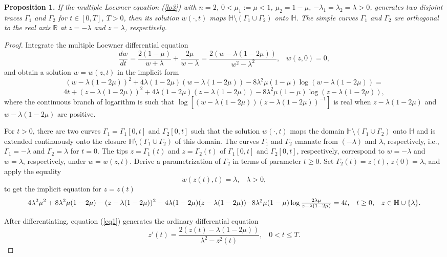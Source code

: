 \documentclass[
11pt,%
tightenlines,%
twoside,%
onecolumn,%
nofloats,%
nobibnotes,%
nofootinbib,%
superscriptaddress,%
noshowpacs,%
centertags]%
{revtex4}
\begin{document}
{\bf Proposition 1.}
{\it If the multiple Loewner equation (\ref{lo3}) with $n=2$, $0<\mu_1:=\mu<1$, $\mu_2=1-\mu$, $-\lambda_1=\lambda_2=\lambda>0$, generates two disjoint traces $\Gamma_1$ and $\Gamma_2$ for $t\in[0,T]$, $T>0$, then its solution $w(\cdot,t)$ maps $\mathbb H\setminus(\Gamma_1\cup\Gamma_2)$ onto $\mathbb H$. The simple curves $\Gamma_1$ and $\Gamma_2$ are orthogonal to the real axis $\mathbb R$ at $z=-\lambda$ and $z=\lambda$, respectively.}
\begin{proof}

Integrate the multiple Loewner differential equation $$\frac{dw}{dt}=\frac{2(1-\mu)}{w+\lambda}+\frac{2\mu}{w-\lambda}=\frac{2(w-\lambda(1-2\mu))}{w^2-\lambda^2},\;\;\;w(z,0)=0,$$ and obtain a solution $w=w(z,t)$ in the implicit form $$(w-\lambda(1-2\mu))^2+4\lambda(1-2\mu)(w-\lambda(1-2\mu))-8\lambda^2\mu(1-\mu)\log(w-\lambda(1-2\mu))=$$
$$4t+(z-\lambda(1-2\mu))^2+4\lambda(1-2\mu)(z-\lambda(1-2\mu))-8\lambda^2\mu(1-\mu)\log(z-\lambda(1-2\mu)),$$
where the continuous branch of logarithm is such that $\log[(w-\lambda(1-2\mu))(z-\lambda(1-2\mu))^{-1}]$ is real when $z-\lambda(1-2\mu)$ and $w-\lambda(1-2\mu)$ are positive.

For $t>0$, there are two curves $\Gamma_1=\Gamma_1[0,t]$ and $\Gamma_2[0,t]$ such that the solution $w(\cdot,t)$ maps the domain $\mathbb H\setminus(\Gamma_1\cup\Gamma_2)$ onto $\mathbb H$ and is extended continuously onto the closure $\overline{\mathbb H\setminus(\Gamma_1\cup\Gamma_2)}$ of this domain. The curves $\Gamma_1$ and $\Gamma_2$ emanate from $(-\lambda)$ and $\lambda$, respectively, i.e., $\Gamma_1=-\lambda$ and $\Gamma_2=\lambda$ for $t=0$. The tips $z=\Gamma_1(t)$ and $z=\Gamma_2(t)$ of $\Gamma_1[0,t]$ and $\Gamma_2[0,t]$, respectively, correspond to $w=-\lambda$ and $w=\lambda$, respectively, under $w=w(z,t)$. Derive a parametrization of $\Gamma_2$ in terms of parameter $t\geq0$. Set $\Gamma_2(t)=z(t)$, $z(0)=\lambda$, and apply the equality $$w(z(t),t)=\lambda,\;\;\;\lambda>0,$$ to get the implicit equation for $z=z(t)$
\begin{equation}
4\lambda^2\mu^2+8\lambda^2\mu(1-2\mu)-(z-\lambda(1-2\mu))^2- 4\lambda(1-2\mu)(z-\lambda(1-2\mu))- $$ $$ 8\lambda^2\mu(1-\mu)\log\frac{2\lambda\mu}{z-\lambda(1-2\mu)}=4t,\;\;\;t\geq0,\;\;\;z\in\mathbb H\cup\{\lambda\}. \label{eq1}
\end{equation}

After differentiating, equation (\ref{eq1}) generates the ordinary differential equation
\begin{equation}
z'(t)=\frac{2(z(t)-\lambda(1-2\mu))}{\lambda^2-z^2(t)},\;\;\;0<t\leq T. \label{der1}
\end{equation}


\end{proof}
\end{document}
